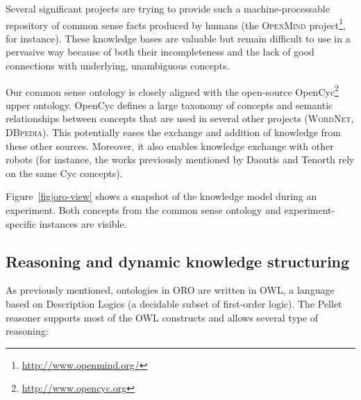 \documentclass[twocolumn]{svjour3}
\begin{document}
Several significant projects are trying to provide such a machine-processable
repository of common sense facts produced by humans (the \textsc{OpenMind}
project\footnote{\url{http://www.openmind.org/}}, for instance). These
knowledge bases are valuable but remain difficult to use in a pervasive way
because of both their incompleteness and the lack of good connections with
underlying, unambiguous concepts.

Our common sense ontology is closely aligned with the open-source
OpenCyc\footnote{\url{http://www.opencyc.org}} upper ontology.
OpenCyc defines a large taxonomy of concepts and semantic
relationships between concepts that are used in several other projects
(\textsc{WordNet, DBpedia}). This potentially eases the exchange and addition
of knowledge from these other sources. Moreover, it also enables knowledge
exchange with other robots (for instance, the works previously mentioned by
Daoutis and Tenorth rely on the same Cyc concepts).

Figure~\ref{fig|oro-view} shows a snapshot of the knowledge model during an
experiment. Both concepts from the common sense ontology and
experiment-specific instances are visible.

\subsection{Reasoning and dynamic knowledge structuring}

As previously mentioned, ontologies in ORO are written in OWL, a language
based on Description Logics (a decidable subset of first-order logic). The
Pellet reasoner supports most of the OWL constructs and allows several type of
reasoning:
\end{document}
